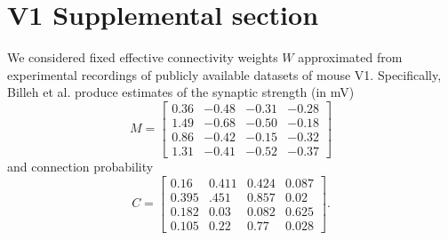 \documentclass[11pt]{article}
\begin{document}
%
%
%

\section{V1 Supplemental section}\label{methods_V1}
 
We considered fixed effective connectivity weights $W$ approximated from experimental recordings of publicly available datasets of mouse V1.  Specifically, Billeh et al. \cite{billeh2019systematic} produce estimates of the synaptic strength (in mV)
\begin{equation}
M = \begin{bmatrix} 
0.36 & -0.48 & -0.31 & -0.28 \\
1.49 & -0.68 & -0.50 & -0.18 \\
0.86 & -0.42 & -0.15 & -0.32 \\
1.31 & -0.41 & -0.52 & -0.37 \end{bmatrix}
\end{equation}
and connection probability
\begin{equation}
C = \begin{bmatrix} 0.16 & 0.411 & 0.424 &  0.087 \\
0.395 & .451 & 0.857 & 0.02 \\
0.182 & 0.03 & 0.082 & 0.625 \\
0.105 & 0.22 & 0.77 & 0.028 \end{bmatrix}.
\end{equation}
\end{document}
